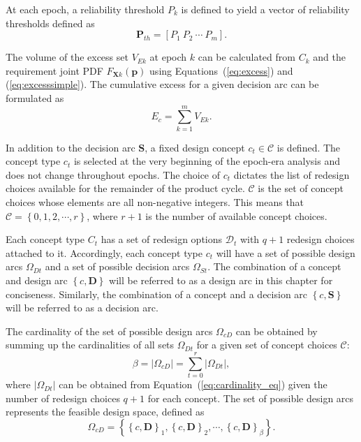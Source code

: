At each epoch, a reliability threshold $P_k$ is defined to yield a vector of reliability thresholds defined as
%
\begin{equation} \label{eq:reliabilitythvector}
	\mathbf{P}_{th} = \left[P_1 ~ P_2 ~ \cdots ~ P_m\right].%
\end{equation}

The volume of the excess set $V_{Ek}$ at epoch $k$ can be calculated from $C_k$ and the requirement joint \ac{PDF} $F_{\mathbf{X}k}(\mathbf{p})$ using Equations~(\ref{eq:excess}) and (\ref{eq:excesssimple}).
The cumulative excess for a given decision arc can be formulated as
%
\begin{equation} \label{eq:excesscumulative}
	E_c = \sum\limits_{k=1}^{m} V_{Ek}.
\end{equation}

In addition to the decision arc $\mathbf{S}$, a fixed design concept $c_t\in\mathcal{C}$ is defined. The concept type $c_t$ is selected at the very beginning of the epoch-era analysis and does not change throughout epochs. The choice of $c_t$ dictates the list of redesign choices available for the remainder of the product cycle. $\mathcal{C}$ is the set of concept choices whose elements are all non-negative integers. This means that $\mathcal{C} = \left\{0,1,2,\cdots,r\right\}$, where $r + 1$ is the number of available concept choices.

Each concept type $C_t$ has a set of redesign options $\mathcal{D}_t$ with $q+1$ redesign choices attached to it. Accordingly, each concept type $c_t$ will have a set of possible design arcs $\Omega_{Dt}$ and a set of possible decision arcs $\Omega_{St}$. The combination of a concept and design arc $\left\{c,\mathbf{D}\right\}$ will be referred to as a design arc in this chapter for conciseness. Similarly, the combination of a concept and a decision arc $\left\{c,\mathbf{S}\right\}$ will be referred to as a decision arc.

The cardinality of the set of possible design arcs $\Omega_{cD}$ can be obtained by summing up the cardinalities of all sets $\Omega_{Dt}$ for a given set of concept choices $\mathcal{C}$:
%
\begin{equation} \label{eq:cardinailitycdarc}
	\beta = |\Omega_{cD}| = \sum\limits_{t=0}^{r} |\Omega_{Dt}|,
\end{equation}
%
where $|\Omega_{Dt}|$ can be obtained from Equation~(\ref{eq:cardinality_eq}) given the number of redesign choices $q+1$ for each concept. The set of possible design arcs represents the feasible design space, defined as
%
\begin{equation} \label{eq:feasibledesignset}
	\Omega_{cD} = \left\{\left\{c,\mathbf{D}\right\}_1,\left\{c,\mathbf{D}\right\}_2,\cdots,\left\{c,\mathbf{D}\right\}_\beta\right\}.
\end{equation}

